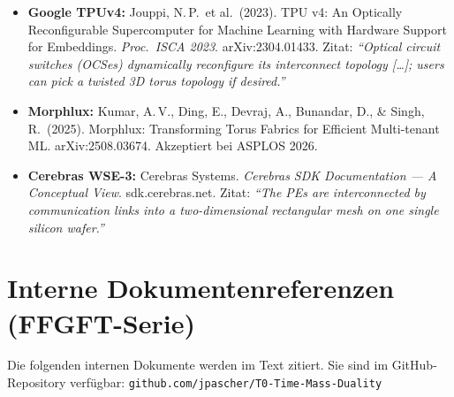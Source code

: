 \begin{itemize}\small
  \item \textbf{Google TPUv4:} Jouppi, N.\,P.\ et al.\ (2023).
        TPU v4: An Optically Reconfigurable Supercomputer for Machine
        Learning with Hardware Support for Embeddings.
        \textit{Proc.\ ISCA 2023}. arXiv:2304.01433.
        Zitat: \textit{``Optical circuit switches (OCSes) dynamically
        reconfigure its interconnect topology [\ldots]; users can pick
        a twisted 3D torus topology if desired.''}

  \item \textbf{Morphlux:} Kumar, A.\,V., Ding, E., Devraj, A.,
        Bunandar, D., \& Singh, R.\ (2025).
        Morphlux: Transforming Torus Fabrics for Efficient
        Multi-tenant ML. arXiv:2508.03674. Akzeptiert bei ASPLOS 2026.

  \item \textbf{Cerebras WSE-3:} Cerebras Systems.
        \textit{Cerebras SDK Documentation --- A Conceptual View}.
        sdk.cerebras.net. Zitat: \textit{``The PEs are interconnected
        by communication links into a two-dimensional rectangular
        mesh on one single silicon wafer.''}
\end{itemize}


\section*{Interne Dokumentenreferenzen (FFGFT-Serie)}

Die folgenden internen Dokumente werden im Text zitiert. Sie sind im
GitHub-Repository verfügbar:
\texttt{github.com/jpascher/T0-Time-Mass-Duality}

\begin{center}
\renewcommand{\arraystretch}{1.3}
{\small
{}
}
\end{center}

